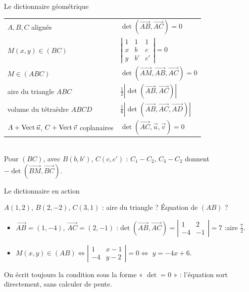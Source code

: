 \documentclass[aspectratio=169,11pt]{beamer}
\newcommand{\vv}[1]{\overrightarrow{#1}}\newcommand{\ve}[1]{\vec{#1}}
\newcommand{\dt}[1]{\left|\begin{matrix}#1\end{matrix}\right|}
\newcommand{\rep}[1]{\textcolor{Vert}{#1}}%
\begin{document}
\begin{frame}{Le dictionnaire géométrique}
\begin{FORM}
\renewcommand{\arraystretch}{1.35}
\begin{tabular}{@{}ll@{}}
$A,B,C$ alignés & $\det(\vv{AB},\vv{AC})=0$\\
$M(x,y)\in(BC)$ & $\dt{1&1&1\\x&b&c\\y&b'&c'}=0$\\
$M\in(ABC)$ & $\det(\vv{AM},\vv{AB},\vv{AC})=0$\\
aire du triangle $ABC$ & $\frac12|\det(\vv{AB},\vv{AC})|$\\
volume du tétraèdre $ABCD$ & $\frac16|\det(\vv{AB},\vv{AC},\vv{AD})|$\\
$A+\vect\ve u$, $C+\vect\ve v$ coplanaires & $\det(\vv{AC},\ve u,\ve v)=0$
\end{tabular}\\[2pt]
{\small Pour $(BC)$, avec $B(b,b')$, $C(c,c')$ : $C_1-C_2$, $C_3-C_2$ donnent $-\det(\vv{BM},\vv{BC})$.}
\end{FORM}
\end{frame}

\begin{frame}{Le dictionnaire en action}
\begin{ATOI}
$A(1,2)$, $B(2,-2)$, $C(3,1)$ : aire du triangle ? Équation de $(AB)$ ?
\end{ATOI}
\pause
\begin{itemize}
\item $\vv{AB}=(1,-4)$, $\vv{AC}=(2,-1)$ :\quad $\det(\vv{AB},\vv{AC})=\dt{1&2\\-4&-1}=7$ :\quad \rep{aire $\frac72$}.
\pause
\item $M(x,y)\in(AB)\iff\dt{1&x-1\\-4&y-2}=0\iff$ \rep{$y=-4x+6$}.
\end{itemize}
\pause
\begin{ASTU}
On écrit toujours la condition sous la forme « $\det=0$ » : l'équation sort directement, sans calculer de pente.
\end{ASTU}
\end{frame}
\end{document}
